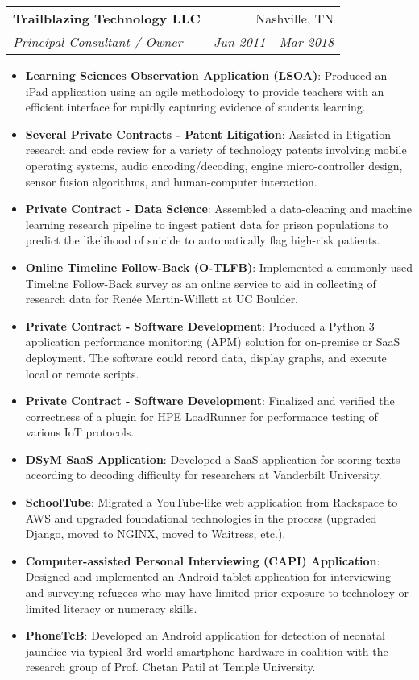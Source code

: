 \documentclass[letterpaper,10pt]{article}
\makeatletter
\newcommand{\resumeItem}[2]{
  \item\small{
    \textbf{#1}{: #2 \vspace{-2pt}}
  }
}
\newcommand{\resumeSubheading}[4]{
  \vspace{-1pt}\item
    \begin{tabular*}{0.97\textwidth}[t]{l@{\extracolsep{\fill}}r}
      \textbf{#1} & #2 \\
      \textit{\small#3} & \textit{\small #4} \\
    \end{tabular*}\vspace{-5pt}
}
\newcommand{\resumeItemListStart}{\begin{itemize}}
\newcommand{\resumeItemListEnd}{\end{itemize}\vspace{-5pt}}
\makeatother
\begin{document}
    \resumeSubheading
      {Trailblazing Technology LLC}{Nashville, TN}
      {Principal Consultant / Owner}{Jun 2011 - Mar 2018}
      \resumeItemListStart
        \resumeItem{Learning Sciences Observation Application (LSOA)}
          {Produced an iPad application using an agile methodology to provide teachers with an efficient interface for rapidly capturing evidence of students learning.}
        \resumeItem{Several Private Contracts - Patent Litigation}
          {Assisted in litigation research and code review for a variety of technology patents involving mobile operating systems, audio encoding/decoding, engine micro-controller design, sensor fusion algorithms, and human-computer interaction.}
        \resumeItem{Private Contract - Data Science}
          {Assembled a data-cleaning and machine learning research pipeline to ingest patient data for prison populations to predict the likelihood of suicide to automatically flag high-risk patients.}
        \resumeItem{Online Timeline Follow-Back (O-TLFB)}
          {Implemented a commonly used Timeline Follow-Back survey as an online service to aid in collecting of research data for Renée Martin-Willett at UC Boulder.}
        \resumeItem{Private Contract - Software Development}
          {Produced a Python 3 application performance monitoring (APM) solution for on-premise or SaaS deployment. The software could record data, display graphs, and execute local or remote scripts.}
        \resumeItem{Private Contract - Software Development}
          {Finalized and verified the correctness of a plugin for HPE LoadRunner for performance testing of various IoT protocols.}
        \resumeItem{DSyM SaaS Application}
          {Developed a SaaS application for scoring texts according to decoding difficulty for researchers at Vanderbilt University.}
        \resumeItem{SchoolTube}
          {Migrated a YouTube-like web application from Rackspace to AWS and upgraded foundational technologies in the process (upgraded Django, moved to NGINX, moved to Waitress, etc.).}
        \resumeItem{Computer-assisted Personal Interviewing (CAPI) Application}
         {Designed and implemented an Android tablet application for interviewing and surveying refugees who may have limited prior exposure to technology or limited literacy or numeracy skills.}
        \resumeItem{PhoneTcB}
          {Developed an Android application for detection of neonatal jaundice via typical 3rd-world smartphone hardware in coalition with the research group of Prof. Chetan Patil at Temple University.}
      \resumeItemListEnd
\end{document}
